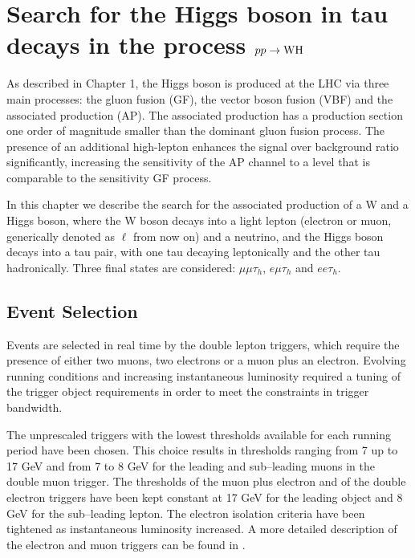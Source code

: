 \chapter[$pp\rightarrow\W\rm{H}$]{Search for the Higgs boson in tau decays in the process $pp\rightarrow\W\rm{H}$}%

As described in Chapter 1, the Higgs boson is produced at the LHC via three main processes: the gluon fusion (GF), the vector boson fusion (VBF) and the associated production (AP). The associated production has a production section one order of magnitude smaller than the dominant gluon fusion process. The presence of an additional high-\pT lepton enhances the signal over background ratio significantly,  increasing the sensitivity of the AP channel to a level that is comparable to the sensitivity GF process. 

In this chapter we describe the search for the associated production of a W and a Higgs boson, where the W boson decays into a light lepton (electron or muon, generically denoted as $\ell$ from now on) and a neutrino, and the Higgs boson decays into a tau pair, with one tau decaying leptonically and the other tau hadronically. Three final states are considered: $\mu\mu\tau_h$, $e\mu\tau_h$ and $ee\tau_h$. 

\section{Event Selection}

Events are selected in real time by the double lepton triggers, which require the presence of either two muons, two electrons or a muon plus an electron. Evolving running conditions and increasing instantaneous luminosity required a tuning of the trigger object requirements in order to meet the constraints in trigger bandwidth. %

The unprescaled triggers with the lowest \pT thresholds available for each running period have been chosen. This choice results in \pT thresholds ranging from 7 up to 17 GeV and from 7 to 8 GeV for the leading and sub--leading muons in the double muon trigger. The \pT thresholds of the muon plus electron and of the double electron triggers have been kept constant at 17 GeV for the leading object and 8 GeV for the sub--leading lepton. The electron isolation criteria have been tightened as instantaneous luminosity increased. %
A more detailed description of the electron and muon triggers can be found in \cite{Chatrchyan:2012xi,CMS-PAS-EGM-10-004}.

